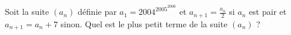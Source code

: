 Soit la suite $(a_n)$ définie par $a_1 = 2004^{2005^{2006}}$ et $a_{n+1} = \frac{a_n}{2}$ si $a_n$ est pair et $a_{n+1} = a_n + 7$ sinon. Quel est le plus petit terme de la suite $(a_n)$ ?
